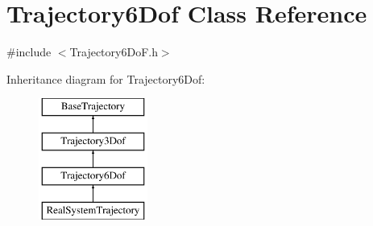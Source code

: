 \hypertarget{class_trajectory6_dof}{}\section{Trajectory6\+Dof Class Reference}
\label{class_trajectory6_dof}


{\ttfamily \#include $<$Trajectory6\+Do\+F.\+h$>$}

Inheritance diagram for Trajectory6\+Dof\+:\begin{figure}[H]
\begin{center}
\leavevmode
\includegraphics[height=4.000000cm]{class_trajectory6_dof}
\end{center}
\end{figure}
